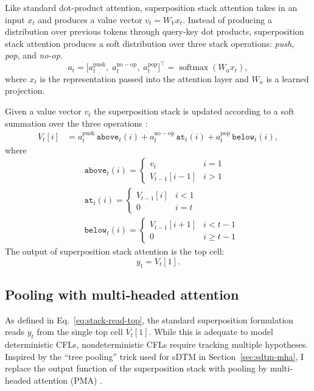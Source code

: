 Like standard dot-product attention, superposition stack attention takes in an input $x_t$ and produces a value vector $v_t=W_Vx_t$. Instead of producing a distribution over previous tokens through query-key dot products, superposition stack attention produces a soft distribution over three stack operations: \textit{push}, \textit{pop}, and \textit{no-op}.
\begin{equation}
  a_t = \bigl[a^{\mathrm{push}}_t,\;a^{\mathrm{no-op}}_t,\;a^{\mathrm{pop}}_t\bigr]^{\top} = \operatorname{softmax}(W_{a}x_{t}),
\end{equation}
where $x_t$ is the representation passed into the attention layer and $W_{a}$ is a learned projection.

Given a value vector $v_t$ the superposition stack is updated according to a soft summation over the three operations \citep{joulin2015inferring}:
\begin{align}
 V_t[i] &= a^{\mathrm{push}}_t\,\texttt{above}_{t}(i)
          + a^{\mathrm{no-op}}_t\,\texttt{at}_{t}(i)
          + a^{\mathrm{pop}}_t\,\texttt{below}_{t}(i), \label{eq:stack-update}
\end{align}
where
\begin{align}
  &\texttt{above}_{t}(i)=\begin{cases}v_t & i=1\\V_{t-1}[i-1] & i>1\end{cases}\\
  &\texttt{at}_{t}(i)=\begin{cases}V_{t-1}[i] & i<1\\0 & i = t \end{cases}\\
  &\texttt{below}_{t}(i)=\begin{cases}V_{t-1}[i+1] & i<t-1\\ 0 & i\geq t-1\end{cases}
\end{align}
The output of superposition stack attention is the top cell:
\begin{equation}
  y_t = V_t[1]. \label{eq:stack-read-top}
\end{equation}

\subsection{Pooling with multi‑headed attention}
As defined in Eq.~\ref{eq:stack-read-top}, the standard superposition formulation reads $y_t$ from the single top cell $V_t[1]$. While this is adequate to model deterministic CFLs, nondeterministic CFLs require tracking multiple hypotheses.  Inspired by the ``tree pooling'' trick used for sDTM in Section~\ref{sec:sdtm-mha}, I replace the output function of the superposition stack with pooling by multi-headed attention (PMA) \citep{lee_set_2019}.

